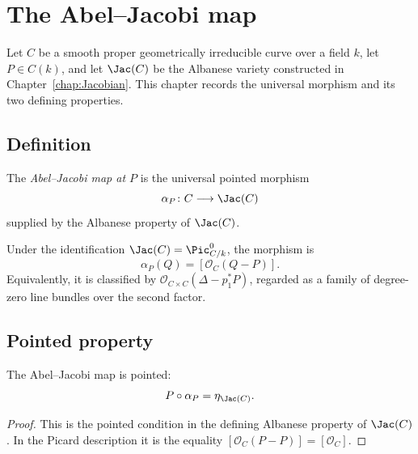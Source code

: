 \chapter{The Abel--Jacobi map}
\label{chap:AbelJacobi}

Let \(C\) be a smooth proper geometrically irreducible curve over a field \(k\),
let \(P \in C(k)\), and let \(\Jac(C)\) be the Albanese variety constructed in
Chapter~\ref{chap:Jacobian}.  This chapter records the universal morphism and its
two defining properties.

\section{Definition}

\begin{definition}\leanok
  \label{def:ofCurve}
  The \emph{Abel--Jacobi map at \(P\)} is the universal pointed morphism
  \[
    \alpha_P \colon C \longrightarrow \Jac(C)
  \]
  supplied by the Albanese property of \(\Jac(C)\).
\end{definition}

\begin{remark}
  \label{rem:ofCurve_classical}
  Under the identification \(\Jac(C) = \Pic^0_{C/k}\), the morphism is
  \[
    \alpha_P(Q) = [\mathcal O_C(Q-P)].
  \]
  Equivalently, it is classified by
  \(\mathcal O_{C\times C}(\Delta-p_1^*P)\), regarded as a family of
  degree-zero line bundles over the second factor.
\end{remark}

\section{Pointed property}

\begin{lemma}\leanok
  \label{lem:comp_ofCurve}
  The Abel--Jacobi map is pointed:
  \[
    P \circ \alpha_P = \eta_{\Jac(C)}.
  \]
\end{lemma}

\begin{proof}
  This is the pointed condition in the defining Albanese property of
  \(\Jac(C)\).  In the Picard description it is the equality
  \([\mathcal O_C(P-P)] = [\mathcal O_C]\).
\end{proof}

